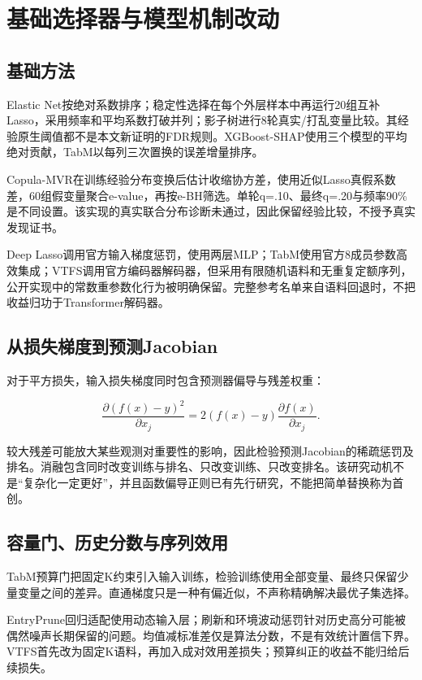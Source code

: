 \documentclass{sufethesismas}
\begin{document}
\chapter{基础选择器与模型机制改动}

\section{基础方法}

Elastic Net按绝对系数排序；稳定性选择在每个外层样本中再运行20组互补Lasso，采用频率和平均系数打破并列；影子树进行8轮真实/打乱变量比较。其经验原生阈值都不是本文新证明的FDR规则。XGBoost-SHAP使用三个模型的平均绝对贡献，TabM以每列三次置换的误差增量排序。

Copula-MVR在训练经验分布变换后估计收缩协方差\cite{ledoit2004}，使用近似Lasso真假系数差，60组假变量聚合e-value，再按e-BH筛选。单轮q=.10、最终q=.20与频率90\%是不同设置。该实现的真实联合分布诊断未通过，因此保留经验比较，不授予真实发现证书。

Deep Lasso调用官方输入梯度惩罚，使用两层MLP；TabM使用官方8成员参数高效集成；VTFS调用官方编码器解码器，但采用有限随机语料和无重复定额序列，公开实现中的常数重参数化行为被明确保留。完整参考名单来自语料回退时，不把收益归功于Transformer解码器。

\section{从损失梯度到预测Jacobian}

对于平方损失，输入损失梯度同时包含预测器偏导与残差权重：

\[
\frac{\partial (f(x)-y)^2}{\partial x_j}
=2(f(x)-y)\frac{\partial f(x)}{\partial x_j}.
\]

较大残差可能放大某些观测对重要性的影响，因此检验预测Jacobian的稀疏惩罚及排名。消融包含同时改变训练与排名、只改变训练、只改变排名。该研究动机不是``复杂化一定更好''，并且函数偏导正则已有先行研究，不能把简单替换称为首创。

\section{容量门、历史分数与序列效用}

TabM预算门把固定K约束引入输入训练，检验训练使用全部变量、最终只保留少量变量之间的差异。直通梯度只是一种有偏近似，不声称精确解决最优子集选择。

EntryPrune回归适配使用动态输入层；刷新和环境波动惩罚针对历史高分可能被偶然噪声长期保留的问题。均值减标准差仅是算法分数，不是有效统计置信下界。VTFS首先改为固定K语料，再加入成对效用差损失；预算纠正的收益不能归给后续损失。
\end{document}
